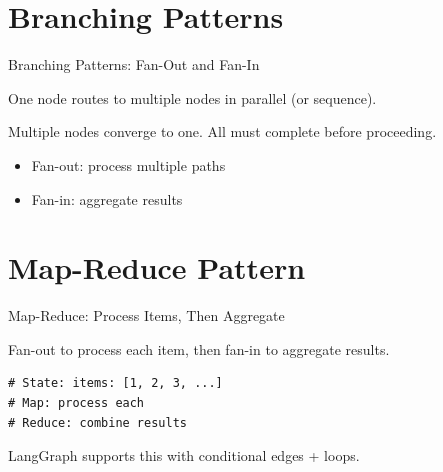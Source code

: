 \documentclass[aspectratio=169,11pt]{beamer}
\begin{document}
\section{Branching Patterns}
\begin{frame}[t]{Branching Patterns: Fan-Out and Fan-In}
\setlength{\itemsep}{1pt}
\vspace{0.1cm}

\begin{tipbox}
One node routes to multiple nodes in parallel (or sequence).
\end{tipbox}

\vspace{0.1cm}

\begin{tipbox}[Fan-In]
Multiple nodes converge to one. All must complete before proceeding.
\end{tipbox}

\vspace{0.15cm}

\begin{conceptbox}
\setlength{\itemsep}{1pt}
\begin{itemize}
  \item Fan-out: process multiple paths
  \item Fan-in: aggregate results
\end{itemize}
\end{conceptbox}
\end{frame}

\section{Map-Reduce Pattern}
\begin{frame}[fragile,t]{Map-Reduce: Process Items, Then Aggregate}
\vspace{0.05cm}

\begin{conceptbox}[Pattern]
Fan-out to process each item, then fan-in to aggregate results.
\end{conceptbox}

\vspace{0.1cm}

\begin{codebox}[Idea]
\begin{lstlisting}
# State: items: [1, 2, 3, ...]
# Map: process each
# Reduce: combine results
\end{lstlisting}
\end{codebox}

\vspace{0.15cm}

{\footnotesize LangGraph supports this with conditional edges + loops.}
\end{frame}
\end{document}
